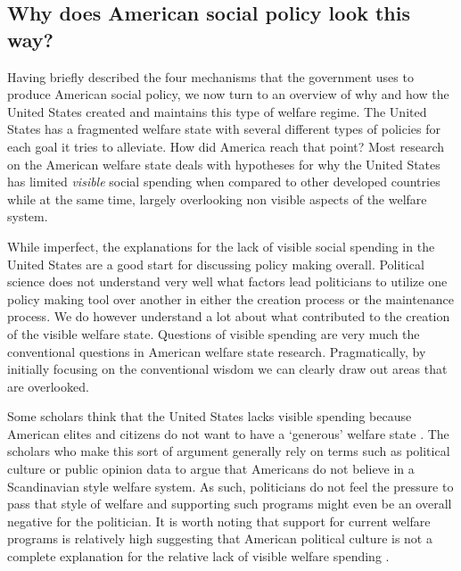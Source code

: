 \documentclass[12pt]{article}
\begin{document}
\subsection{Why does American social policy look this way?}
Having briefly described the four mechanisms that the government uses to produce American social policy, we now turn to an overview of why and how the United States created and maintains this type of welfare regime. The United States has a fragmented welfare state with several different types of policies for each goal it tries to alleviate. How did America reach that point? Most research on the American welfare state deals with hypotheses for why the United States has limited \emph{visible} social spending when compared to other developed countries while at the same time, largely overlooking non visible aspects of the welfare system.

While imperfect, the explanations for the lack of visible social spending in the United States are a good start for discussing policy making overall. Political science does not understand very well what factors lead politicians to utilize one policy making tool over another in either the creation process or the maintenance process. We do however understand a lot about what contributed to the creation of the visible welfare state. Questions of visible spending are very much the conventional questions in American welfare state research. Pragmatically, by initially focusing on the conventional wisdom we can clearly draw out areas that are overlooked.

Some scholars think that the United States lacks visible spending because American elites and citizens do not want to have a `generous' welfare state \citep{king1973}. The scholars who make this sort of argument generally rely on terms such as political culture or public opinion data to argue that Americans do not believe in a Scandinavian style welfare system. As such, politicians do not feel the pressure to pass that style of welfare and supporting such programs might even be an overall negative for the politician. It is worth noting that support for current welfare programs is relatively high suggesting that American political culture is not a complete explanation for the relative lack of visible welfare spending \citep[Ch. 6]{howard2008}.
\end{document}
